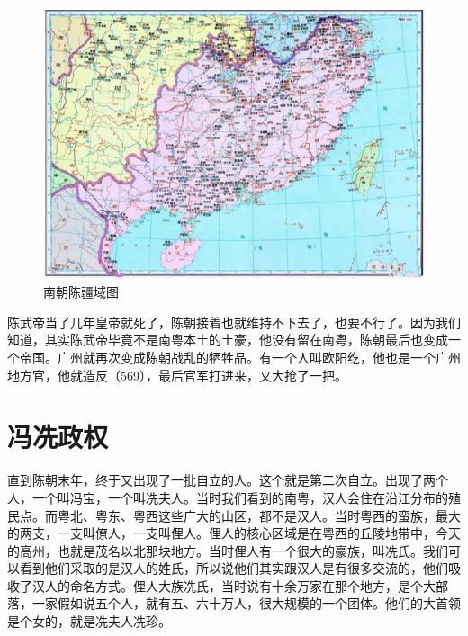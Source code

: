 \begin{figure}
	\centering
	\includegraphics[width=\textwidth]{images/image-20}
	\caption{南朝陈疆域图}
\end{figure}

陈武帝当了几年皇帝就死了，陈朝接着也就维持不下去了，也要不行了。因为我们知道，其实陈武帝毕竟不是南粤本土的土豪，他没有留在南粤，陈朝最后也变成一个帝国。广州就再次变成陈朝战乱的牺牲品。有一个人叫欧阳纥，他也是一个广州地方官，他就造反（569），最后官军打进来，又大抢了一把。

\section{冯冼政权}

直到陈朝末年，终于又出现了一批自立的人。这个就是第二次自立。出现了两个人，一个叫冯宝，一个叫冼夫人。当时我们看到的南粤，汉人会住在沿江分布的殖民点。而粤北、粤东、粤西这些广大的山区，都不是汉人。当时粤西的蛮族，最大的两支，一支叫僚人，一支叫俚人。俚人的核心区域是在粤西的丘陵地带中，今天的高州，也就是茂名以北那块地方。当时俚人有一个很大的豪族，叫冼氏。我们可以看到他们采取的是汉人的姓氏，所以说他们其实跟汉人是有很多交流的，他们吸收了汉人的命名方式。俚人大族冼氏，当时说有十余万家在那个地方，是个大部落，一家假如说五个人，就有五、六十万人，很大规模的一个团体。他们的大首领是个女的，就是冼夫人冼珍。

